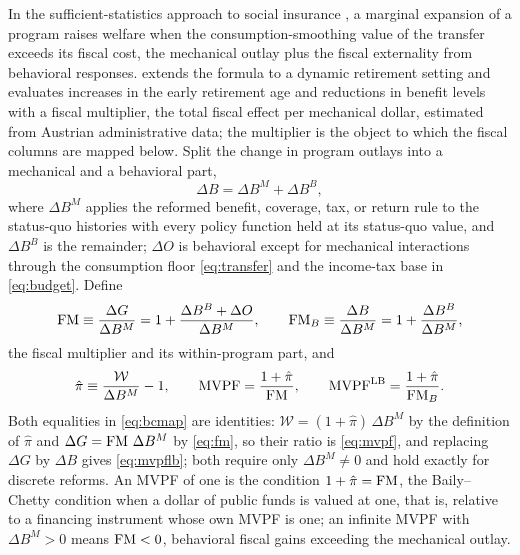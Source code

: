 In the sufficient-statistics approach to social insurance \citep{baily1978some,chetty2006general,chetty2008moral,chetty2009sufficient,chetty2013social}, a marginal expansion of a program raises welfare when the consumption-smoothing value of the transfer exceeds its fiscal cost, the mechanical outlay plus the fiscal externality from behavioral responses. \citet{haller2022welfare} extends the formula to a dynamic retirement setting and evaluates increases in the early retirement age and reductions in benefit levels with a fiscal multiplier, the total fiscal effect per mechanical dollar, estimated from Austrian administrative data; the multiplier is the object to which the fiscal columns are mapped below.
Split the change in program outlays into a mechanical and a behavioral part,
\begin{equation}\label{eq:decomp}
\Delta B=\Delta B^{M}+\Delta B^{B},
\end{equation}
where $\Delta B^{M}$ applies the reformed benefit, coverage, tax, or return rule to the status-quo histories with every policy function held at its status-quo value, and $\Delta B^{B}$ is the remainder; $\Delta O$ is behavioral except for mechanical interactions through the consumption floor \eqref{eq:transfer} and the income-tax base in \eqref{eq:budget}. Define
\begin{equation}\label{eq:fm}
\operatorname{FM}\equiv\frac{\Delta G}{\Delta B^{M}}=1+\frac{\Delta B^{B}+\Delta O}{\Delta B^{M}},
\qquad
\operatorname{FM}_{B}\equiv\frac{\Delta B}{\Delta B^{M}}=1+\frac{\Delta B^{B}}{\Delta B^{M}},
\end{equation}
the fiscal multiplier and its within-program part, and
\begin{equation}\label{eq:bcmap}
\hat{\pi}\equiv\frac{\mathcal{W}}{\Delta B^{M}}-1,
\qquad
\operatorname{MVPF}=\frac{1+\hat{\pi}}{\operatorname{FM}},
\qquad
\operatorname{MVPF}^{\mathrm{LB}}=\frac{1+\hat{\pi}}{\operatorname{FM}_{B}}.
\end{equation}
Both equalities in \eqref{eq:bcmap} are identities: $\mathcal{W}=(1+\hat\pi)\,\Delta B^{M}$ by the definition of $\hat\pi$ and $\Delta G=\operatorname{FM}\,\Delta B^{M}$ by \eqref{eq:fm}, so their ratio is \eqref{eq:mvpf}, and replacing $\Delta G$ by $\Delta B$ gives \eqref{eq:mvpflb}; both require only $\Delta B^{M}\neq0$ and hold exactly for discrete reforms. An MVPF of one is the condition $1+\hat\pi=\operatorname{FM}$, the Baily--Chetty condition when a dollar of public funds is valued at one, that is, relative to a financing instrument whose own MVPF is one; an infinite MVPF with $\Delta B^{M}>0$ means $\operatorname{FM}<0$, behavioral fiscal gains exceeding the mechanical outlay.


